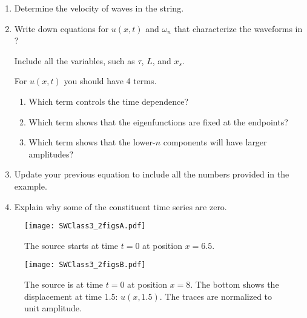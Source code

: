 \documentclass[11pt,titlepage,fleqn]{article}
\begin{document}
\begin{enumerate}
\item Determine the velocity of waves in the string.

\item Write down equations for $u(x,t)$ and $\omega_n$ that characterize the waveforms in ?

Include all the variables, such as $\tau$, $L$, and $x_s$.

For $u(x,t)$ you should have 4 terms.

\begin{enumerate}
\item Which term controls the time dependence?
\item Which term shows that the eigenfunctions are fixed at the endpoints?
\item Which term shows that the lower-$n$ components will have larger amplitudes?
\end{enumerate}

\item Update your previous equation to include all the numbers provided in the example.

\item Explain why some of the constituent time series are zero.
\end{enumerate}





\begin{figure}
\centering
\texttt{[image: SWClass3\_2figsA.pdf]}
\caption[]
{{
The source starts at time $t = 0$ at position $x=6.5$.
}}
\label{fig:time}
\end{figure}

\begin{figure}
\centering
\texttt{[image: SWClass3\_2figsB.pdf]}
\caption[]
{{
The source is at time $t=0$ at position $x=8$. The bottom shows the displacement at time 1.5: $u(x,1.5)$. The traces are normalized to unit amplitude.
}}
\label{fig:space}
\end{figure}

\end{document}
